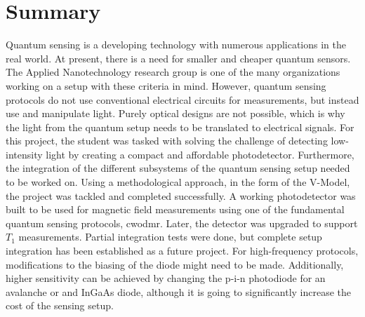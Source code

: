 \documentclass{report}
\begin{document}
	\chapter{Summary}
	Quantum sensing is a developing technology with numerous applications in the real world. At present, there is a need for smaller and cheaper quantum sensors. The Applied Nanotechnology research group is one of the many organizations working on a setup with these criteria in mind. However, quantum sensing protocols do not use conventional electrical circuits for measurements, but instead use and manipulate light. Purely optical designs are not possible, which is why the light from the quantum setup needs to be translated to electrical signals. For this project, the student was tasked with solving the challenge of detecting low-intensity light by creating a compact and affordable photodetector. Furthermore, the integration of the different subsystems of the quantum sensing setup needed to be worked on. Using a methodological approach, in the form of the V-Model, the project was tackled and completed successfully. A working photodetector was built to be used for magnetic field measurements using one of the fundamental quantum sensing protocols, \gls{cwodmr}. Later, the detector was upgraded to support $T_1$ measurements. Partial integration tests were done, but complete setup integration has been established as a future project. For high-frequency protocols, modifications to the biasing of the diode might need to be made. Additionally, higher sensitivity can be achieved by changing the p-i-n photodiode for an avalanche or and InGaAs diode, although it is going to significantly increase the cost of the sensing setup.
	
	
	
	
	
	
	
	
	
	
	
	
	
	
	
	\printglossary[type=\acronymtype]
	\printbibliography
	
\end{document}
